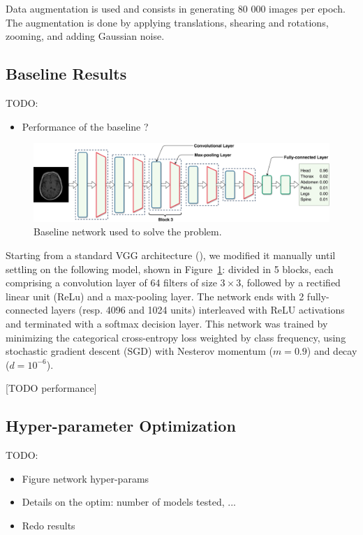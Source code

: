 Data augmentation is used and consists in generating 80 000 images per epoch. The augmentation is done by applying translations, shearing and rotations, zooming, and adding Gaussian noise.

\subsection{Baseline Results}

TODO:
\begin{itemize}
    \item Performance of the baseline ?
\end{itemize}

\begin{figure}[htb]
	\centering
	\includegraphics[width=\linewidth]{img_hyperopt/convnet.pdf}
	\caption{Baseline network used to solve the problem.}
	\label{fig:baseline}
\end{figure}

Starting from a standard VGG architecture (\textcite{simonyan2014}), we modified it manually until settling on the following model, shown in Figure~\ref{fig:baseline}: divided in 5 blocks, each comprising a convolution layer of 64 filters of size $3\times 3$, followed by a rectified linear unit (ReLu) and a max-pooling layer. The network ends with 2 fully-connected layers (resp. 4096 and 1024 units) interleaved with ReLU activations and terminated with a softmax decision layer. This network was trained by minimizing the categorical cross-entropy loss weighted by class frequency, using stochastic gradient descent (SGD) with Nesterov momentum ($m = 0.9$) and decay ($d = 10^{-6}$).

[TODO performance]

\subsection{Hyper-parameter Optimization}

TODO:
\begin{itemize}
    \item Figure network hyper-params
    \item Details on the optim: number of models tested, ...
    \item Redo results
\end{itemize}

